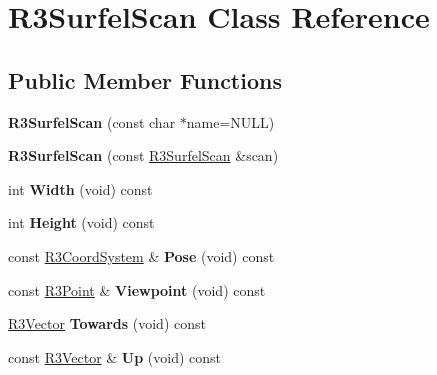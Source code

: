 \hypertarget{class_r3_surfel_scan}{}\section{R3\+Surfel\+Scan Class Reference}
\label{class_r3_surfel_scan}
\subsection*{Public Member Functions}
\begin{DoxyCompactItemize}
\item 
{\bfseries R3\+Surfel\+Scan} (const char $\ast$name=N\+U\+LL)\hypertarget{class_r3_surfel_scan_a0b6693f3ad10b3e7b47e205d7fb5c655}{}\label{class_r3_surfel_scan_a0b6693f3ad10b3e7b47e205d7fb5c655}

\item 
{\bfseries R3\+Surfel\+Scan} (const \hyperlink{class_r3_surfel_scan}{R3\+Surfel\+Scan} \&scan)\hypertarget{class_r3_surfel_scan_a886b2b11f8f0d701f705a8b3e5b3a899}{}\label{class_r3_surfel_scan_a886b2b11f8f0d701f705a8b3e5b3a899}

\item 
int {\bfseries Width} (void) const \hypertarget{class_r3_surfel_scan_a1111c1a946869fd4fdc3f52cce43d319}{}\label{class_r3_surfel_scan_a1111c1a946869fd4fdc3f52cce43d319}

\item 
int {\bfseries Height} (void) const \hypertarget{class_r3_surfel_scan_ae1fa1489079a20d6e923f64c94288314}{}\label{class_r3_surfel_scan_ae1fa1489079a20d6e923f64c94288314}

\item 
const \hyperlink{class_r3_coord_system}{R3\+Coord\+System} \& {\bfseries Pose} (void) const \hypertarget{class_r3_surfel_scan_a5ecc0f26b6c9654b2b6f7da37afbcf4d}{}\label{class_r3_surfel_scan_a5ecc0f26b6c9654b2b6f7da37afbcf4d}

\item 
const \hyperlink{class_r3_point}{R3\+Point} \& {\bfseries Viewpoint} (void) const \hypertarget{class_r3_surfel_scan_a17383311bedbed659456376c3ddc4dcf}{}\label{class_r3_surfel_scan_a17383311bedbed659456376c3ddc4dcf}

\item 
\hyperlink{class_r3_vector}{R3\+Vector} {\bfseries Towards} (void) const \hypertarget{class_r3_surfel_scan_abbd8656de1be6460852e690bdd9155cb}{}\label{class_r3_surfel_scan_abbd8656de1be6460852e690bdd9155cb}

\item 
const \hyperlink{class_r3_vector}{R3\+Vector} \& {\bfseries Up} (void) const \hypertarget{class_r3_surfel_scan_aca583f253a8eb896894ea90397c48b6c}{}\label{class_r3_surfel_scan_aca583f253a8eb896894ea90397c48b6c}


\end{DoxyCompactItemize}
